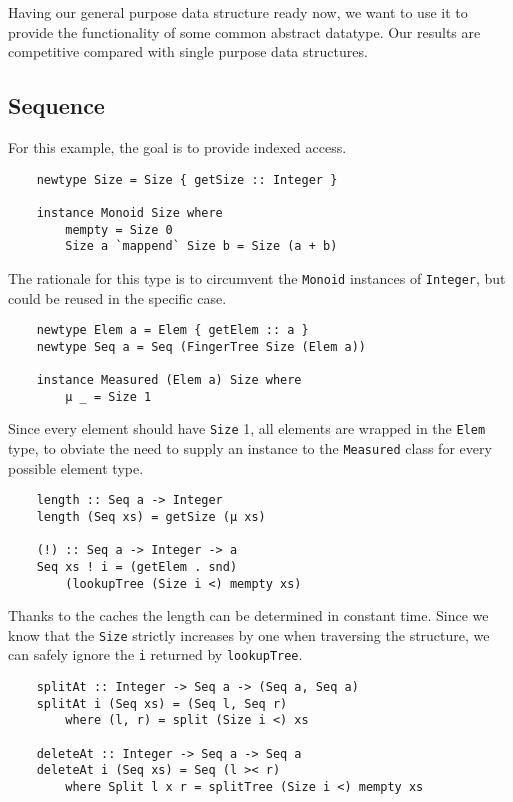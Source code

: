 Having our general purpose data structure ready now, we want to use it to provide the functionality of some common abstract datatype. Our results are competitive compared with single purpose data structures.

\subsection{Sequence}
For this example, the goal is to provide indexed access. 
\begin{verbatim}
    newtype Size = Size { getSize :: Integer }

    instance Monoid Size where
        mempty = Size 0
        Size a `mappend` Size b = Size (a + b)
\end{verbatim}

The rationale for this type is to circumvent the \texttt{Monoid} instances of \texttt{Integer}, but could be reused in the specific case.

\begin{verbatim}
    newtype Elem a = Elem { getElem :: a }
    newtype Seq a = Seq (FingerTree Size (Elem a))
    
    instance Measured (Elem a) Size where
        μ _ = Size 1
\end{verbatim}

Since every element should have \texttt{Size} 1, all elements are wrapped in the \texttt{Elem} type, to obviate the need to supply an instance to the \texttt{Measured} class for every possible element type.

\begin{verbatim}
    length :: Seq a -> Integer
    length (Seq xs) = getSize (μ xs)

    (!) :: Seq a -> Integer -> a
    Seq xs ! i = (getElem . snd)
        (lookupTree (Size i <) mempty xs)
\end{verbatim}

Thanks to the caches the length can be determined in constant time. Since we know that the \texttt{Size} strictly increases by one when traversing the structure, we can safely ignore the \texttt{i} returned by \texttt{lookupTree}.

\begin{verbatim}
    splitAt :: Integer -> Seq a -> (Seq a, Seq a)
    splitAt i (Seq xs) = (Seq l, Seq r)
        where (l, r) = split (Size i <) xs

    deleteAt :: Integer -> Seq a -> Seq a
    deleteAt i (Seq xs) = Seq (l >< r)
        where Split l x r = splitTree (Size i <) mempty xs
\end{verbatim}

